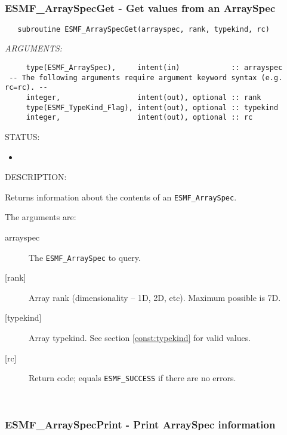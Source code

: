  
\mbox{}\hrulefill\ 
 
\subsubsection [ESMF\_ArraySpecGet] {ESMF\_ArraySpecGet - Get values from an ArraySpec}


  
\begin{verbatim}   subroutine ESMF_ArraySpecGet(arrayspec, rank, typekind, rc)\end{verbatim}{\em ARGUMENTS:}
\begin{verbatim}     type(ESMF_ArraySpec),     intent(in)            :: arrayspec
 -- The following arguments require argument keyword syntax (e.g. rc=rc). --
     integer,                  intent(out), optional :: rank
     type(ESMF_TypeKind_Flag), intent(out), optional :: typekind
     integer,                  intent(out), optional :: rc\end{verbatim}
{\sf STATUS:}
   \begin{itemize}
   \item{}
   \end{itemize}
  
{\sf DESCRIPTION:\\ }


     Returns information about the contents of an {\tt ESMF\_ArraySpec}.
  
     The arguments are:
     \begin{description}
     \item[arrayspec]
       The {\tt ESMF\_ArraySpec} to query.
     \item[{[rank]}]
       Array rank (dimensionality -- 1D, 2D, etc). Maximum possible is 7D.
     \item[{[typekind]}]
       Array typekind.  See section \ref{const:typekind} for valid values.
     \item[{[rc]}]
       Return code; equals {\tt ESMF\_SUCCESS} if there are no errors.
     \end{description}
   
 
\mbox{}\hrulefill\ 
 
\subsubsection [ESMF\_ArraySpecPrint] {ESMF\_ArraySpecPrint - Print ArraySpec information}


